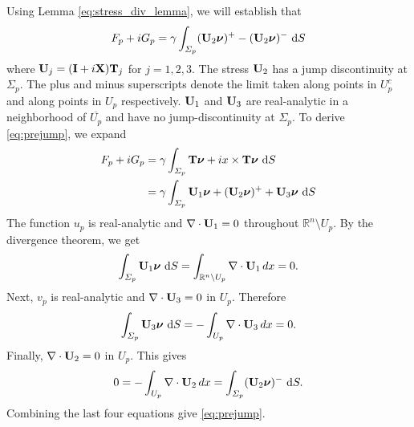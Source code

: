\documentclass[lineno]{jfm}
\newcommand{\nnu}{\boldsymbol{\nu}}
\begin{document}
Using Lemma \ref{eq:stress_div_lemma}, we will establish that
\begin{equation}
  \label{eq:prejump}
  F_p + i G_p = \gamma \int_{\Sigma_p}  ({\bf U}_2\nnu)^+ - ({\bf
  U}_2\nnu)^-\,\dif S
\end{equation}
where ${\bf U}_j = ({\bf I} + i {\bf X}){\bf T}_j$ for $j = 1, 2, 3.$
The stress ${\bf U}_2$ has a jump discontinuity at $\Sigma_p.$
The plus and minus superscripts denote
the limit taken along points in $U_p^c$ and along points in $U_p$
respectively.
${\bf U}_1$ and ${\bf U}_3$ are real-analytic in a neighborhood of $\overline{U_p}$
and have no jump-discontinuity at $\Sigma_p$.
To derive \eqref{eq:prejump}, we expand
\begin{align*}
  F_p + i G_p
  &= \gamma \int_{\Sigma_p} {\bf T} \nnu + ix \times {\bf T} \nnu \,\dif S \\
  &= \gamma \int_{\Sigma_p}  {\bf U}_1\nnu  + ({\bf U}_2\nnu)^+ + {\bf
  U}_3\nnu\,\dif S
\end{align*}
The function $u_p$ is real-analytic and
$\nabla \cdot {\bf U}_1 = 0$ throughout $\mathbb{R}^n \setminus U_p$.
By the divergence theorem, we get
\begin{equation*}
  \int_{\Sigma_p}  {\bf U}_1 \nnu\,\dif S
  = \int_{\mathbb{R}^n \setminus U_p} \nabla \cdot {\bf U}_1 \,dx = 0.
\end{equation*}
Next, $v_p$ is real-analytic and
$\nabla \cdot {\bf U}_3 = 0$ in $U_p$. Therefore
\begin{equation*}
  \int_{\Sigma_p}  {\bf U}_3 \nnu\,\dif S
  = -\int_{U_p} \nabla \cdot {\bf U}_3 \,dx = 0.
\end{equation*}
Finally, $\nabla \cdot {\bf U}_2= 0$ in $U_p$. This gives
\[
0 = -\int_{U_p} \nabla \cdot {\bf U}_2 \,dx = \int_{\Sigma_p}  ({\bf
U}_2 \nnu)^-\,\dif S.
\]
Combining the last four equations give \eqref{eq:prejump}.
\end{document}

